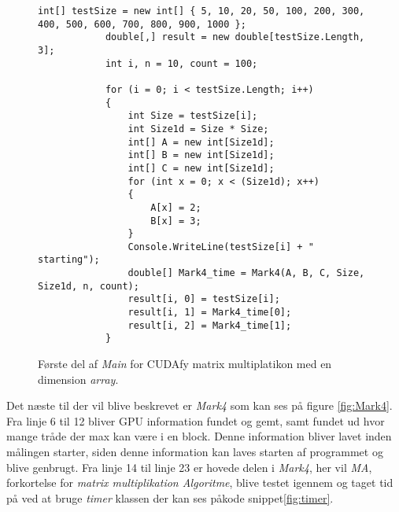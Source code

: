 \begin{figure}[h]
    \centering
    \lstset{style=sharpc}
	\begin{lstlisting}
int[] testSize = new int[] { 5, 10, 20, 50, 100, 200, 300, 400, 500, 600, 700, 800, 900, 1000 };
            double[,] result = new double[testSize.Length, 3];
            int i, n = 10, count = 100;
            
            for (i = 0; i < testSize.Length; i++)
            {
                int Size = testSize[i];
                int Size1d = Size * Size;
                int[] A = new int[Size1d];
                int[] B = new int[Size1d];
                int[] C = new int[Size1d];
                for (int x = 0; x < (Size1d); x++)
                {
                    A[x] = 2;
                    B[x] = 3;
                }
                Console.WriteLine(testSize[i] + " starting");
                double[] Mark4_time = Mark4(A, B, C, Size, Size1d, n, count);
                result[i, 0] = testSize[i];
                result[i, 1] = Mark4_time[0];
                result[i, 2] = Mark4_time[1];
            }
	\end{lstlisting}
    \caption{Første del af \textit{Main} for CUDAfy matrix multiplatikon med en dimension \textit{array}.}
    \label{fig:MainPart1}
\end{figure}

Det næste til der vil blive beskrevet er \textit{Mark4} som kan ses på figure \ref{fig:Mark4}. Fra linje 6 til 12 bliver GPU information fundet og gemt, samt fundet ud hvor mange tråde der max kan være i en block. Denne information bliver lavet inden målingen starter, siden denne information kan laves starten af programmet og blive genbrugt. Fra linje 14 til linje 23 er hovede delen i \textit{Mark4}, her vil \textit{MA}, forkortelse for \textit{matrix multiplikation Algoritme}, blive testet igennem og taget tid på ved at bruge \textit{timer} klassen der kan ses påkode snippet\ref{fig:timer}.

